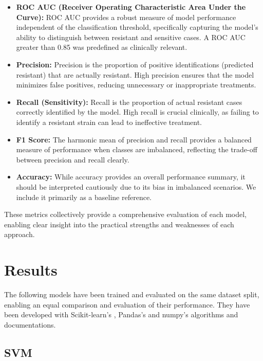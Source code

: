 \documentclass{article}
\begin{document}
\begin{itemize}
    \item \textbf{ROC AUC (Receiver Operating Characteristic Area Under the Curve):} 
    ROC AUC provides a robust measure of model performance independent of the classification threshold, specifically capturing the model's ability to distinguish between resistant and sensitive cases. A ROC AUC greater than 0.85 was predefined as clinically relevant.

    \item \textbf{Precision:} Precision is the proportion of positive identifications (predicted resistant) that are actually resistant. High precision ensures that the model minimizes false positives, reducing unnecessary or inappropriate treatments.

    \item \textbf{Recall (Sensitivity):} Recall is the proportion of actual resistant cases correctly identified by the model. High recall is crucial clinically, as failing to identify a resistant strain can lead to ineffective treatment.

    \item \textbf{F1 Score:} The harmonic mean of precision and recall provides a balanced measure of performance when classes are imbalanced, reflecting the trade-off between precision and recall clearly.

    \item \textbf{Accuracy:} While accuracy provides an overall performance summary, it should be interpreted cautiously due to its bias in imbalanced scenarios. We include it primarily as a baseline reference.
\end{itemize}

These metrics collectively provide a comprehensive evaluation of each model, enabling clear insight into the practical strengths and weaknesses of each approach.

\section{Results}

The following models have been trained and evaluated on the same dataset split, enabling an equal comparison and evaluation of their performance. They have been developed with Scikit-learn's \citep{scikit-learn}, Pandas's \citep{pandas} and numpy's \citep{numpy} algorithms and documentations. 

\subsection{SVM}
\end{document}
